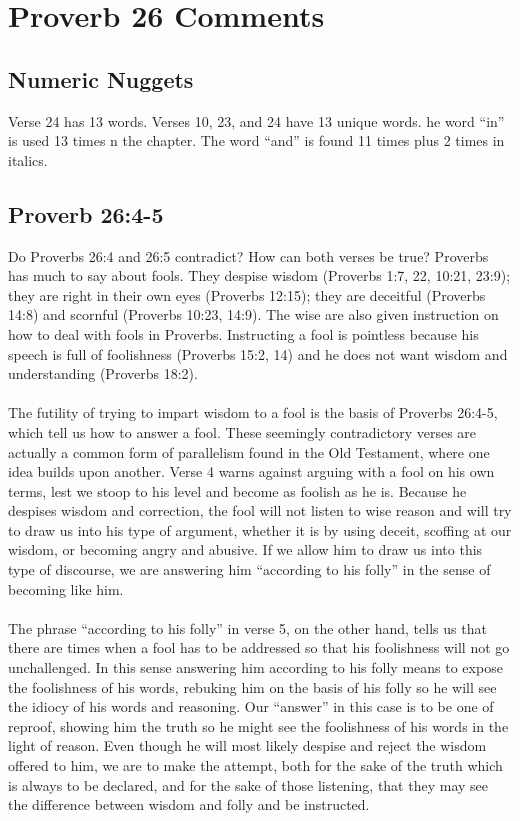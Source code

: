 \section{Proverb 26 Comments}

\subsection{Numeric Nuggets}
Verse 24 has 13 words.  Verses 10, 23, and 24 have 13 unique words. he word ``in'' is used 13 times n the chapter. The word ``and'' is found 11 times plus 2 times in italics.

\subsection{Proverb 26:4-5}
Do Proverbs 26:4 and 26:5 contradict? How can both verses be true? Proverbs has much to say about fools. They despise wisdom (Proverbs 1:7, 22, 10:21, 23:9); they are right in their own eyes (Proverbs 12:15); they are deceitful (Proverbs 14:8) and scornful (Proverbs 10:23, 14:9). The wise are also given instruction on how to deal with fools in Proverbs. Instructing a fool is pointless because his speech is full of foolishness (Proverbs 15:2, 14) and he does not want wisdom and understanding (Proverbs 18:2).\\
\\
The futility of trying to impart wisdom to a fool is the basis of Proverbs 26:4-5, which tell us how to answer a fool. These seemingly contradictory verses are actually a common form of parallelism found in the Old Testament, where one idea builds upon another. Verse 4 warns against arguing with a fool on his own terms, lest we stoop to his level and become as foolish as he is. Because he despises wisdom and correction, the fool will not listen to wise reason and will try to draw us into his type of argument, whether it is by using deceit, scoffing at our wisdom, or becoming angry and abusive. If we allow him to draw us into this type of discourse, we are answering him ``according to his folly'' in the sense of becoming like him.\\
\\
The phrase ``according to his folly'' in verse 5, on the other hand, tells us that there are times when a fool has to be addressed so that his foolishness will not go unchallenged. In this sense answering him according to his folly means to expose the foolishness of his words, rebuking him on the basis of his folly so he will see the idiocy of his words and reasoning. Our ``answer'' in this case is to be one of reproof, showing him the truth so he might see the foolishness of his words in the light of reason. Even though he will most likely despise and reject the wisdom offered to him, we are to make the attempt, both for the sake of the truth which is always to be declared, and for the sake of those listening, that they may see the difference between wisdom and folly and be instructed.\\

